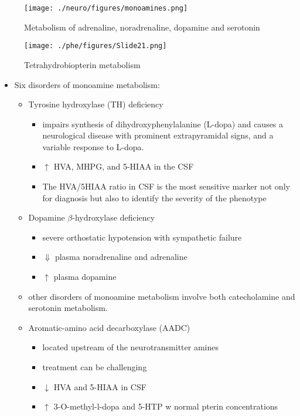 \documentclass{scrartcl}
\begin{document}
\begin{figure}[htbp]
\centering
\texttt{[image: ./neuro/figures/monoamines.png]}
\caption{\label{fig:orgd154dd8}
Metabolism of adrenaline, noradrenaline, dopamine and serotonin}
\end{figure}

\begin{figure}[htbp]
\centering
\texttt{[image: ./phe/figures/Slide21.png]}
\caption{\label{fig:org21f669d}
Tetrahydrobiopterin metabolism}
\end{figure}

\begin{itemize}
\item Six disorders of monoamine metabolism:
\begin{itemize}
\item Tyrosine hydroxylase (TH) deficiency
\begin{itemize}
\item impairs synthesis of dihydroxyphenylalanine (L-dopa) and causes
a neurological disease with prominent extrapyramidal signs, and
a variable response to L-dopa.
\item \(\uparrow\) HVA, MHPG, and 5-HIAA in the CSF
\item The HVA/5HIAA ratio in CSF is the most sensitive marker not only
for diagnosis but also to identify the severity of the phenotype
\end{itemize}
\item Dopamine \(\beta\)-hydroxylase deficiency
\begin{itemize}
\item severe orthostatic hypotension with sympathetic failure
\item \(\Downarrow\) plasma noradrenaline and adrenaline
\item \(\uparrow\) plasma dopamine
\end{itemize}
\item other disorders of monoamine metabolism involve both catecholamine
and serotonin metabolism.
\item Aromatic-amino acid decarboxylase (AADC)
\begin{itemize}
\item located upstream of the neurotransmitter amines
\item treatment can be challenging
\item \(\downarrow\) HVA and 5-HIAA in CSF
\item \(\uparrow\) 3-O-methyl-l-dopa and 5-HTP w normal pterin concentrations

\end{itemize}
\end{itemize}
\end{itemize}
\end{document}
